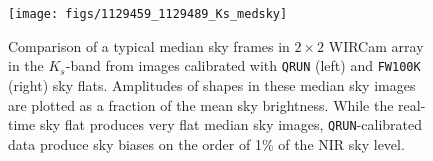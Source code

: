 \documentclass[iop]{emulateapj}
\newcommand{\ie}{\textit{i.e.,~}}
\newcommand{\todo}[1]{\textcolor{BurntOrange}{\textsf{#1}}} %
\newcommand{\Fig}[1]{Fig.~\ref{fig:#1}}  %
\newcommand{\Sec}[1]{\S\ref{sec:#1}}  %
\begin{document}




\begin{figure}[t]
\centering
\texttt{[image: figs/1129459\_1129489\_Ks\_medsky]}
\caption{Comparison of a typical median sky frames in $2\times 2$ WIRCam array in the $K_s$-band from images calibrated with \texttt{QRUN} (left) and \texttt{FW100K} (right) sky flats.
Amplitudes of shapes in these median sky images are plotted as a fraction of the mean sky brightness.
While the real-time sky flat produces very flat median sky images, \texttt{QRUN}-calibrated data produce sky biases on the order of 1\% of the NIR sky level.
}
\label{fig:median_sky_images}
\end{figure}
\end{document}
